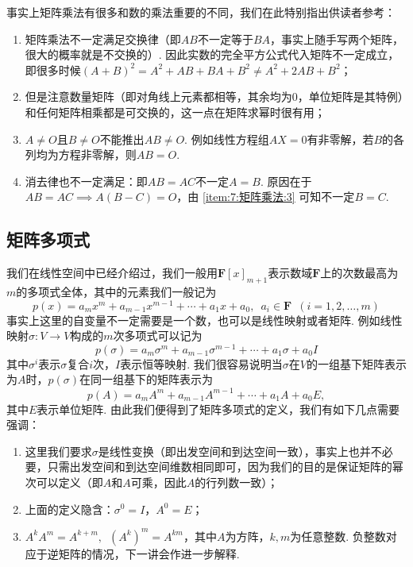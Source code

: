 事实上矩阵乘法有很多和数的乘法重要的不同，我们在此特别指出供读者参考：
\begin{enumerate}[label=(\arabic*)]
    \item 矩阵乘法不一定满足交换律（即$AB$不一定等于$BA$，事实上随手写两个矩阵，很大的概率就是不交换的）. 因此实数的完全平方公式代入矩阵不一定成立，即很多时候$(A+B)^2=A^2+AB+BA+B^2\neq A^2+2AB+B^2$；

    \item 但是注意数量矩阵（即对角线上元素都相等，其余均为0，单位矩阵是其特例）和任何矩阵相乘都是可交换的，这一点在矩阵求幂时很有用；

    \item \label{item:7:矩阵乘法:3}
          $A\neq O$且$B\neq O$不能推出$AB\neq O$. 例如线性方程组$AX = 0$有非零解，若$B$的各列均为方程非零解，则$AB = O$.

    \item 消去律也不一定满足：即$AB = AC$不一定$A = B$. 原因在于$AB=AC \implies A(B-C)=O$，由 \ref*{item:7:矩阵乘法:3} 可知不一定$B = C$.
\end{enumerate}

\subsection{矩阵多项式}

我们在线性空间中已经介绍过，我们一般用$\mathbf{F}[x]_{m+1}$表示数域$\mathbf{F}$上的次数最高为$m$的多项式全体，其中的元素我们一般记为
\[p(x)=a_mx^m+a_{m-1}x^{m-1}+\cdots+a_1x+a_0,\enspace a_i\in\mathbf{F}\enspace(i=1,2,\ldots,m)\]
事实上这里的自变量不一定需要是一个数，也可以是线性映射或者矩阵. 例如线性映射$\sigma:V\to V$构成的$m$次多项式可以记为
\[p(\sigma)=a_m\sigma^m+a_{m-1}\sigma^{m-1}+\cdots+a_1\sigma+a_0I\]
其中$\sigma^i$表示$\sigma$复合$i$次，$I$表示恒等映射. 我们很容易说明当$\sigma$在$V$的一组基下矩阵表示为$A$时，$p(\sigma)$在同一组基下的矩阵表示为
\[p(A)=a_mA^m+a_{m-1}A^{m-1}+\cdots+a_1A+a_0E,\]
其中$E$表示单位矩阵. 由此我们便得到了矩阵多项式的定义，我们有如下几点需要强调：
\begin{enumerate}
    \item 这里我们要求$\sigma$是线性变换（即出发空间和到达空间一致），事实上也并不必要，只需出发空间和到达空间维数相同即可，因为我们的目的是保证矩阵的幂次可以定义（即$A$和$A$可乘，因此$A$的行列数一致）；

    \item 上面的定义隐含：$\sigma^0 = I$，$A^0=E$；

    \item $A^kA^m=A^{k+m},\enspace (A^k)^m=A^{km}$，其中$A$为方阵，$k,m$为任意整数. 负整数对应于逆矩阵的情况，下一讲会作进一步解释.
\end{enumerate}

